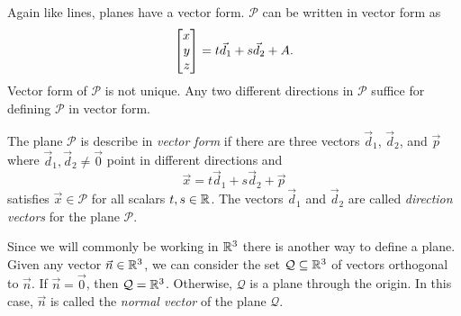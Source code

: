 Again like lines, planes have a vector form.  $\mathcal P$ can be written in vector form as
\[
	\mat{x\\y\\z} = t\vec d_1+s\vec d_2+A.
\]
Vector form of $\mathcal P$ is not unique.  Any two different directions in $\mathcal P$
suffice for defining $\mathcal P$ in vector form.

\begin{center}
\end{center}

\begin{definition}
	The plane $\mathcal P$ is describe in \emph{vector form} if there are
	three vectors $\vec d_1$, $\vec d_2$, and $\vec p$ where $\vec d_1,\vec d_2\neq \vec 0$
	point in different directions and
	\[
		\vec x=t\vec d_1+s\vec d_2+\vec p
	\]
	satisfies $\vec x\in \mathcal P$ for all scalars $t,s\in\mathbb{R}$.  The vectors $\vec d_1$
	and $\vec d_2$ are called \emph{direction vectors} for the plane $\mathcal P$.
\end{definition}

Since we will commonly be working in $\mathbb{R}^3$ there is another way to define a plane.  Given
any vector $\vec n\in\mathbb{R}^3$, we can consider the set $\mathcal Q\subseteq\mathbb{R}^3$ of vectors orthogonal to $\vec n$.
If $\vec n=\vec 0$, then $\mathcal Q=\mathbb{R}^3$.  Otherwise, $\mathcal Q$ is a plane through the origin.
In this case, $\vec n$ is called the \emph{normal vector} of the plane $\mathcal Q$.


